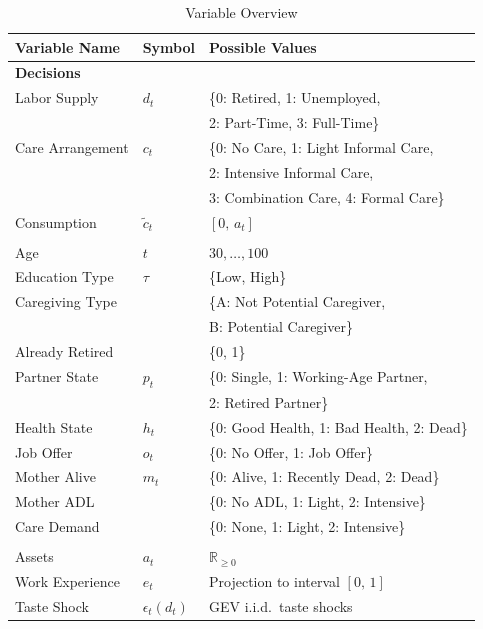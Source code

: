 \begin{table}[htbp]
\centering
\caption{Variable Overview}
\label{tab:variable_overview}
\small
\begin{tabular}{lll}
\toprule
\textbf{Variable Name} & \textbf{Symbol} & \textbf{Possible Values} \\
\midrule
\multicolumn{3}{l}{\textbf{Decisions}} \\
\addlinespace
Labor Supply        & $d_t$           & \{0: Retired, 1: Unemployed, \\
                    &                 & \phantom{\{} 2: Part-Time, 3: Full-Time\} \\
Care Arrangement    & $c_t$           & \{0: No Care, 1: Light Informal Care, \\
                    &                 & \phantom{\{} 2: Intensive Informal Care, \\
                    &                 & \phantom{\{} 3: Combination Care, 4: Formal Care\} \\
Consumption         & $\tilde{c}_t$   & $[0,\, a_t]$ \\
\addlinespace
\midrule
\multicolumn{3}{l}{\textbf{Discrete States}} \\
\addlinespace
Age                 & $t$             & $30,\ldots,100$ \\
Education Type      & $\tau$          & \{Low, High\} \\
Caregiving Type     &                 & \{A: Not Potential Caregiver, \\
                    &                 & \phantom{\{} B: Potential Caregiver\} \\
Already Retired     &                 & \{0, 1\} \\
Partner State       & $p_t$           & \{0: Single, 1: Working-Age Partner, \\
                    &                 & \phantom{\{} 2: Retired Partner\} \\
Health State        & $h_t$           & \{0: Good Health, 1: Bad Health, 2: Dead\} \\
Job Offer           & $o_t$           & \{0: No Offer, 1: Job Offer\} \\
Mother Alive        & $m_t$           & \{0: Alive, 1: Recently Dead, 2: Dead\} \\
Mother ADL          &                 & \{0: No ADL, 1: Light, 2: Intensive\} \\
Care Demand         &                 & \{0: None, 1: Light, 2: Intensive\} \\
\addlinespace
\midrule
\multicolumn{3}{l}{\textbf{Continuous States}} \\
\addlinespace
Assets              & $a_t$           & $\mathbb{R}_{\geq 0}$ \\
Work Experience     & $e_t$           & Projection to interval $[0,\,1]$ \\
Taste Shock         & $\epsilon_t(d_t)$ & GEV i.i.d.\ taste shocks \\
\bottomrule
\end{tabular}


\end{table}
